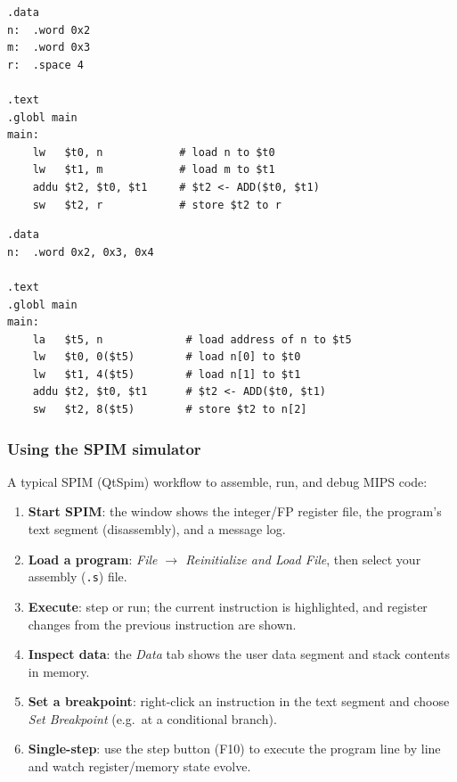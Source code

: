 \begin{eg}
\leavevmode
\begin{lstlisting}
.data
n:  .word 0x2
m:  .word 0x3
r:  .space 4

.text
.globl main
main:
    lw   $t0, n            # load n to $t0
    lw   $t1, m            # load m to $t1
    addu $t2, $t0, $t1     # $t2 <- ADD($t0, $t1)
    sw   $t2, r            # store $t2 to r
\end{lstlisting}
\end{eg}

\begin{eg}
\leavevmode
\begin{lstlisting}
.data
n:  .word 0x2, 0x3, 0x4

.text
.globl main
main:
    la   $t5, n             # load address of n to $t5
    lw   $t0, 0($t5)        # load n[0] to $t0
    lw   $t1, 4($t5)        # load n[1] to $t1
    addu $t2, $t0, $t1      # $t2 <- ADD($t0, $t1)
    sw   $t2, 8($t5)        # store $t2 to n[2]
\end{lstlisting}
\end{eg}

\subsubsection{Using the SPIM simulator}

A typical SPIM (QtSpim) workflow to assemble, run, and debug MIPS code:
\begin{enumerate}
  \item \textbf{Start SPIM}: the window shows the integer/FP register file,
  the program's text segment (disassembly), and a message log.
  \item \textbf{Load a program}: \emph{File $\to$ Reinitialize and Load
  File}, then select your assembly (\texttt{.s}) file.
  \item \textbf{Execute}: step or run; the current instruction is
  highlighted, and register changes from the previous instruction are shown.
  \item \textbf{Inspect data}: the \emph{Data} tab shows the user data
  segment and stack contents in memory.
  \item \textbf{Set a breakpoint}: right-click an instruction in the text
  segment and choose \emph{Set Breakpoint} (e.g.\ at a conditional branch).
  \item \textbf{Single-step}: use the step button (F10) to execute the
  program line by line and watch register/memory state evolve.
\end{enumerate}

